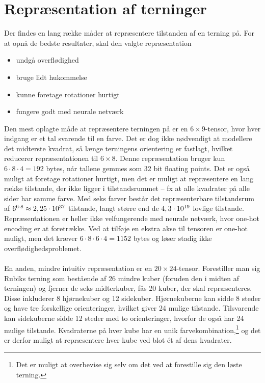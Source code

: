 \documentclass[../main.tex]{subfiles}
\begin{document}
\section{Repræsentation af terninger}\label{sec:repr}
Der findes en lang række måder at repræsentere tilstanden af en terning på.
For at opnå de bedste resultater, skal den valgte repræsentation
\begin{itemize}
	\item undgå overflødighed
	\item bruge lidt hukommelse
	\item kunne foretage rotationer hurtigt
	\item fungere godt med neurale netværk
\end{itemize}
Den mest oplagte måde at repræsentere terningen på er en $ 6\times 9 $-tensor, hvor hver indgang er et tal svarende til en farve.
Det er dog ikke nødvendigt at modellere det midterste kvadrat, så længe terningens orientering er fastlagt, hvilket reducerer repræsentationen til $ 6\times 8 $.
Denne repræsentation bruger kun $ 6\cdot 8\cdot 4=192 $ bytes, når tallene gemmes som 32 bit floating points.
Det er også muligt at foretage rotationer hurtigt, men det er muligt at repræsentere en lang række tilstande, der ikke ligger i tilstandsrummet -- fx at alle kvadrater på alle sider har samme farve.
Med seks farver består det repræsenterbare tilstandsrum af $ 6^{6\cdot 8}\approx 2,25\cdot10^{37} $ tilstande, langt større end de $ 4,3\cdot10^{19} $ lovlige tilstande.
Repræsentationen er heller ikke velfungerende med neurale netværk, hvor one-hot encoding er at foretrække.
Ved at tilføje en ekstra akse til tensoren er one-hot muligt, men det kræver $ 6\cdot 8\cdot 6\cdot 4=1152 $ bytes og løser stadig ikke overflødighedsproblemet.\\
\\
En anden, mindre intuitiv repræsentation er en $ 20\times 24 $-tensor.
Forestiller man sig Rubiks terning som bestående af 26 mindre kuber (foruden den i midten af terningen) og fjerner de seks midterkuber, fås 20 kuber, der skal repræsenteres.
Disse inkluderer 8 hjørnekuber og 12 sidekuber.
Hjørnekuberne kan sidde 8 steder og have tre forskellige orienteringer, hvilket giver 24 mulige tilstande.
Tilsvarende kan sidekuberne sidde 12 steder med to orienteringer, hvorfor de også har 24 mulige tilstande.
Kvadraterne på hver kube har en unik farvekombination,\footnote{Det er muligt at overbevise sig selv om det ved at forestille sig den løste terning.} og det er derfor muligt at repræsentere hver kube ved blot ét af dens kvadrater.
\end{document}
